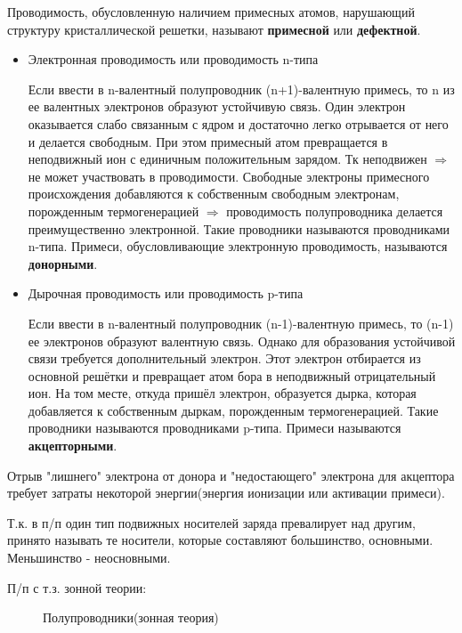 Проводимость, обусловленную наличием примесных атомов, нарушающий структуру кристаллической решетки, называют \textbf{примесной} или \textbf{дефектной}.

\begin{itemize}
\item Электронная проводимость или проводимость n-типа

Если ввести в n-валентный полупроводник (n+1)-валентную примесь, то n из ее валентных электронов образуют устойчивую связь. Один электрон оказывается слабо связанным с ядром и достаточно легко отрывается от него и делается свободным. При этом примесный атом превращается в неподвижный ион с единичным положительным зарядом. Тк неподвижен $\Rightarrow$ не может участвовать в проводимости. Свободные электроны примесного происхождения добавляются к собственным свободным электронам, порожденным термогенерацией $\Rightarrow$ проводимость полупроводника делается преимущественно электронной. Такие проводники называются проводниками n-типа. Примеси, обусловливающие электронную проводимость, называются \textbf{донорными}.

\item Дырочная проводимость или проводимость p-типа

Если ввести в n-валентный полупроводник (n-1)-валентную примесь, то (n-1) ее электронов образуют валентную связь. Однако для образования устойчивой связи требуется дополнительный электрон. Этот электрон отбирается из основной решётки и превращает атом бора в неподвижный отрицательный ион. На том месте, откуда пришёл электрон, образуется дырка, которая добавляется к собственным дыркам, порожденным термогенерацией. Такие проводники называются проводниками p-типа. Примеси называются \textbf{акцепторными}. 
\end{itemize}

Отрыв "лишнего" электрона от донора и "недостающего" электрона для акцептора требует затраты некоторой энергии(энергия ионизации или активации примеси). 

Т.к. в п/п один тип подвижных носителей заряда превалирует над другим, принято называть те носители, которые составляют большинство, основными. Меньшинство - неосновными.
\pagebreak

П/п с т.з. зонной теории:
\begin{center}
	\begin{figure}[h!]
		\caption{Полупроводники(зонная теория)}	
		\label{2D}
	\end{figure}
\end{center}

